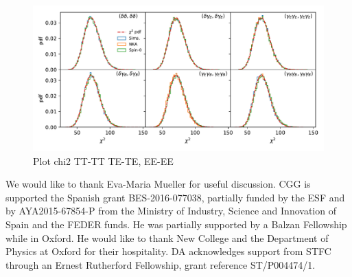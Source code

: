 \documentclass[a4paper,11pt]{article}
\begin{document}
\begin{figure}[htb]
  \centering
  \includegraphics[width=\textwidth]{./figures/run_chi2_TT_TE_EE_TB_EB_BB.pdf}
  \caption{Plot chi2 TT-TT TE-TE, EE-EE}
  \label{fig:chi2_1bin_flat}
\end{figure}

\acknowledgments

We would like to thank Eva-Maria Mueller for useful discussion. CGG is
supported the Spanish grant BES-2016-077038, partially funded by the ESF and by
AYA2015-67854-P from the Ministry of Industry, Science and Innovation of Spain
and the FEDER funds. He was partially supported by a Balzan Fellowship while
in Oxford. He would like to thank New College and the Department of Physics at
Oxford for their hospitality. DA acknowledges support from STFC through an
Ernest Rutherford Fellowship, grant reference ST/P004474/1.

\appendix



\end{document}
